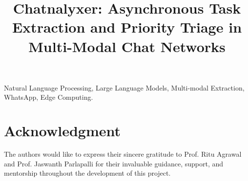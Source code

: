 \documentclass[conference]{IEEEtran}
\begin{document}
\title{Chatnalyxer: Asynchronous Task Extraction and Priority Triage in Multi-Modal Chat Networks}

\author{
}

\maketitle



\begin{IEEEkeywords}
Natural Language Processing, Large Language Models, Multi-modal Extraction, WhatsApp, Edge Computing.
\end{IEEEkeywords}






























\section*{Acknowledgment}
The authors would like to express their sincere gratitude to Prof. Ritu Agrawal and Prof. Jaswanth Parlapalli for their invaluable guidance, support, and mentorship throughout the development of this project.

\appendices



\end{document}
